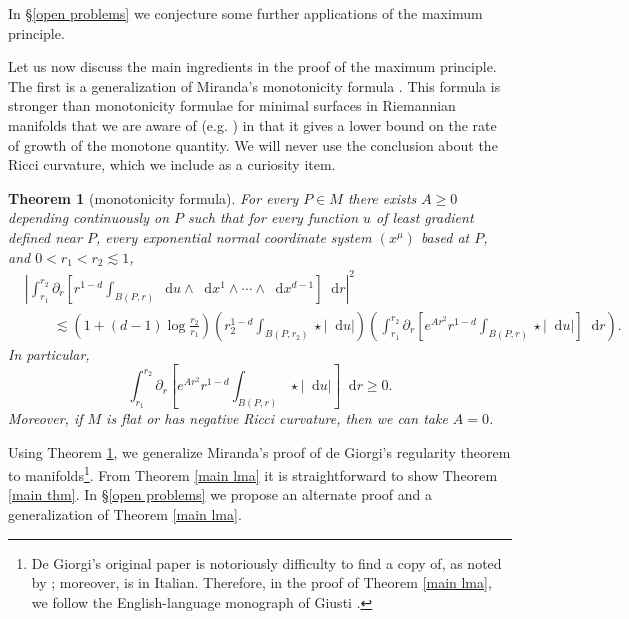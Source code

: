 \documentclass[reqno,10pt]{amsart}
\newcommand*\dif{\mathop{}\!\mathrm{d}}
\newtheorem{mainthm}{Theorem}
\theoremstyle{definition}
\numberwithin{equation}{section}
\begin{document}
In \S\ref{open problems} we conjecture some further applications of the maximum principle.

Let us now discuss the main ingredients in the proof of the maximum principle.
The first is a generalization of Miranda's monotonicity formula \cite[Theorem 2.8]{Miranda66}.
This formula is stronger than monotonicity formulae for minimal surfaces in Riemannian manifolds that we are aware of (e.g. \cite[\S7]{MarquesXX}) in that it gives a lower bound on the rate of growth of the monotone quantity.
We will never use the conclusion about the Ricci curvature, which we include as a curiosity item.

\begin{mainthm}[monotonicity formula]\label{monotonicity prestate}
For every $P \in M$ there exists $A \geq 0$ depending continuously on $P$ such that for every function $u$ of least gradient defined near $P$, every exponential normal coordinate system $(x^\mu)$ based at $P$, and $0 < r_1 < r_2 \lesssim 1$,
\begin{align*}
&\left|\int_{r_1}^{r_2} \partial_r \left[r^{1 - d} \int_{B(P, r)} \dif u \wedge \dif x^1 \wedge \cdots \wedge \dif x^{d - 1}\right] \dif r\right|^2 \\
&\qquad \lesssim \left(1 + (d - 1) \log \frac{r_2}{r_1}\right) \left(r_2^{1 - d}\int_{B(P, r_2)} \star |\dif u| \right)\left(\int_{r_1}^{r_2} \partial_r \left[e^{Ar^2} r^{1 - d} \int_{B(P, r)} \star |\dif u|\right] \dif r\right).
\end{align*}
In particular,
\begin{equation}\label{weak monotonicity}
\int_{r_1}^{r_2} \partial_r \left[e^{Ar^2} r^{1 - d} \int_{B(P, r)} \star |\dif u|\right] \dif r \geq 0.
\end{equation}
Moreover, if $M$ is flat or has negative Ricci curvature, then we can take $A = 0$.
\end{mainthm}

Using Theorem \ref{monotonicity prestate}, we generalize Miranda's proof \cite{Miranda66} of de Giorgi's regularity theorem \cite{deGiorgi61} to manifolds\footnote{De Giorgi's original paper \cite{deGiorgi61} is notoriously difficulty to find a copy of, as noted by \cite{Miranda66, Giusti77}; moreover, \cite{Miranda66} is in Italian. Therefore, in the proof of Theorem \ref{main lma}, we follow the English-language monograph of Giusti \cite[Part 1]{Giusti77}.}.
From Theorem \ref{main lma} it is straightforward to show Theorem \ref{main thm}.
In \S\ref{open problems} we propose an alternate proof and a generalization of Theorem \ref{main lma}.
\end{document}
